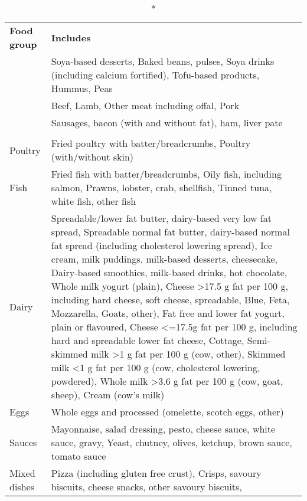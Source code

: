 \begingroup
\setlength{}
\setlength{}\fontsize{12.0pt}{14.4pt}\selectfont
\begin{longtable}{@{\extracolsep{\fill}}>{\raggedright\arraybackslash}p{}>{\raggedright\arraybackslash}p{}}
\caption*{
{\large \textbf{Supplementary table 1. Summary of included foods for each food group.}}
} \\ 
\toprule
\textbf{Food group} & \textbf{Includes} \\ 
\midrule\addlinespace[2.5pt]
{\bfseries Legumes} & Soya-based desserts, Baked beans, pulses, Soya drinks (including calcium fortified),
  Tofu-based products, Hummus, Peas \\ 
{\bfseries Red meat} & Beef, Lamb, Other meat including offal, Pork \\ 
{\bfseries Processed meat} & Sausages, bacon (with and without fat), ham, liver pate \\ 
{\bfseries Animal-based foods} &   \\ 
Poultry & Fried poultry with batter/breadcrumbs, Poultry (with/without skin) \\ 
Fish & Fried fish with batter/breadcrumbs, Oily fish, including salmon, Prawns, lobster, crab, shellfish,
  Tinned tuna, white fish, other fish \\ 
Dairy & Spreadable/lower fat butter, dairy-based very low fat spread, Spreadable normal fat butter, dairy-based normal fat spread (including cholesterol lowering spread),
  Ice cream, milk puddings, milk-based desserts, cheesecake, Dairy-based smoothies, milk-based drinks, hot chocolate,
  Whole milk yogurt (plain), Cheese >17.5 g fat per 100 g, including hard cheese, soft cheese, spreadable, Blue, Feta, Mozzarella, Goats, other),
  Fat free and lower fat yogurt, plain or flavoured, Cheese <=17.5g fat per 100 g, including hard and spreadable lower fat cheese, Cottage,
  Semi-skimmed milk >1 g fat per 100 g (cow, other), Skimmed milk <1 g fat per 100 g (cow, cholesterol lowering, powdered),
  Whole milk >3.6 g fat per 100 g (cow, goat, sheep), Cream (cow's milk) \\ 
Eggs & Whole eggs and processed (omelette, scotch eggs, other) \\ 
Sauces & Mayonnaise, salad dressing, pesto, cheese sauce, white sauce, gravy, Yeast, chutney, olives, ketchup, brown sauce, tomato sauce \\ 
Mixed dishes & Pizza (including gluten free crust), Crisps, savoury biscuits, cheese snacks, other savoury biscuits,

\end{longtable}
